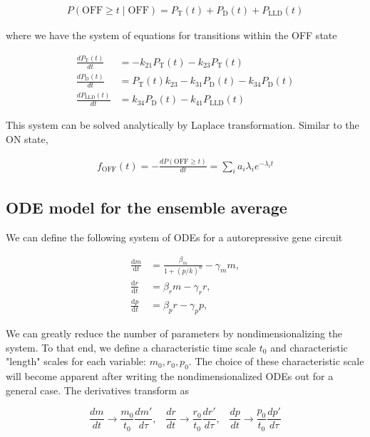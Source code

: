 \documentclass{ucetd}
\begin{document}
\begin{appendices}
\begin{align*}
P(\mathrm{OFF} \geq t\; | \; \mathrm{OFF}) = P_{\mathrm{T}}(t) + P_{\mathrm{D}}(t) + P_{\mathrm{LLD}}(t)
\end{align*}

where we have the system of equations for transitions within the OFF state

\begin{align*}
\frac{dP_{\mathrm{T}}(t)}{dt} &= -k_{21}P_{\mathrm{T}}(t) - k_{23}P_{\mathrm{T}}(t)\\
\frac{dP_{\mathrm{D}}(t)}{dt} &= P_{\mathrm{T}}(t)k_{23}-k_{31}P_{\mathrm{D}}(t) - k_{34}P_{\mathrm{D}}(t)\\
\frac{dP_{\mathrm{LLD}}(t)}{dt} &= k_{34}P_{\mathrm{D}}(t) - k_{41}P_{\mathrm{LLD}}(t)
\end{align*}

This system can be solved analytically by Laplace transformation. Similar to the ON state, 

\begin{align*}
f_{\mathrm{OFF}}(t) = -\frac{dP(\mathrm{OFF} \geq t)}{dt} = \sum_{i}a_{i}\lambda_{i}e^{-\lambda_{i}t}
\end{align*}


\subsection{ODE model for the ensemble average}

We can define the following system of ODEs for a autorepressive gene circuit

\begin{align}
\frac{\mathrm{d}m}{\mathrm{d}t} &= \frac{\beta_{m}}{1 + (p/k)^n} - \gamma_m m,\\[1em]
\frac{\mathrm{d}r}{\mathrm{d}t} &= \beta_{r} m - \gamma_r r,\\[1em]
\frac{\mathrm{d}p}{\mathrm{d}t} &= \beta_{p} r - \gamma_{p} p,
\end{align}

We can greatly reduce the number of parameters by nondimensionalizing the system. To that end, we define a characteristic time scale $t_{0}$ and characteristic "length" scales for each variable: $m_{0}, r_{0}, p_{0}$. The choice of these characteristic scale will become apparent after writing the nondimensionalized ODEs out for a general case. The derivatives transform as

\begin{equation*}
\frac{dm}{dt} \rightarrow \frac{m_{0}}{t_{0}}\frac{dm'}{d\tau}, \;\;\; \frac{dr}{dt} \rightarrow \frac{r_{0}}{t_{0}}\frac{dr'}{d\tau},  \;\;\; \frac{dp}{dt} \rightarrow \frac{p_{0}}{t_{0}}\frac{dp'}{d\tau} 
\end{equation*}


\end{appendices}
\end{document}
